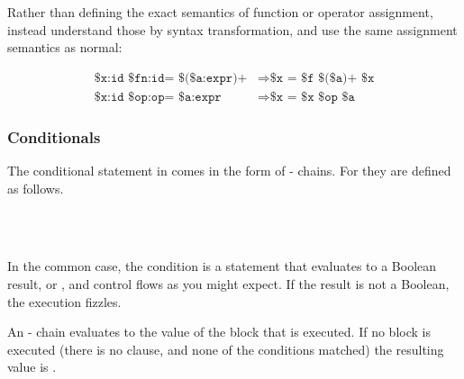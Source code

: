 Rather than defining the exact semantics of function or operator assignment,
instead understand those by syntax transformation, and use the same assignment
semantics as normal:

\begin{align*}
    \texttt{\$x:id \$fn:id= \$(\$a:expr)+} &\Rightarrow \texttt{\$x = \$f \$(\$a)+ \$x} \\ %
    \texttt{\$x:id \$op:op= \$a:expr} & \Rightarrow \texttt{\$x = \$x \$op \$a} %
\end{align*}

\subsubsection{Conditionals}

The conditional statement in \Trilogy{} comes in the form of -
chains. For \Prose{} they are defined as follows.

\begin{bnf*}
     \\
     \\
\end{bnf*}

In the common case, the condition is a statement that evaluates to a Boolean
result,  or , and control flows as you might expect.
If the result is not a Boolean, the execution fizzles.

An - chain evaluates to the value of the block that is executed.
If no block is executed (there is no  clause, and none of the
conditions matched) the resulting value is .

\begin{prooftree}
\end{prooftree}
\begin{prooftree}
\end{prooftree}
\begin{prooftree}
\end{prooftree}
\begin{prooftree}
\end{prooftree}

